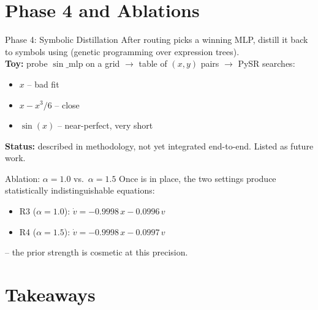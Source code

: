 \documentclass[
11pt,notheorems,hyperref={pdfauthor=Aniruddha Pandey}
]{beamer}
\begin{document}
\section{Phase 4 and Ablations}

\begin{frame}{Phase 4: Symbolic Distillation}
After routing picks a winning MLP, distill it back to symbols using  (genetic programming over expression trees).\\[0.3cm]
\textbf{Toy:} probe $\sin\mathrm{\_mlp}$ on a grid $\to$ table of $(x,y)$ pairs $\to$ PySR searches:
\begin{itemize}
    \item $x$ -- bad fit
    \item $x - x^3/6$ -- close
    \item $\sin(x)$ -- near-perfect, very short \example{\checkmark}
\end{itemize}
\vspace{0.3cm}
\textbf{Status:} described in methodology, \alert{not yet integrated end-to-end}. Listed as future work.
\end{frame}

\begin{frame}{Ablation: $\alpha=1.0$ vs.\ $\alpha=1.5$}
Once  is in place, the two settings produce statistically indistinguishable equations:
\begin{itemize}
    \item R3 ($\alpha=1.0$): $\dot{v} = -0.9998\,x - 0.0996\,v$
    \item R4 ($\alpha=1.5$): $\dot{v} = -0.9998\,x - 0.0997\,v$
\end{itemize}
\vspace{0.3cm}
 -- the prior strength is cosmetic at this precision.
\end{frame}


\section{Takeaways}
\end{document}
